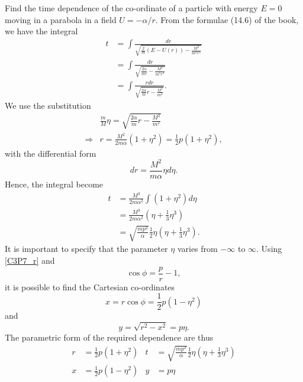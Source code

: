 \begin{problem}
{
Find the time dependence of the co-ordinate of a particle with energy $E=0$ moving in a parabola in a field $U=-\alpha/r$.
}
{
From the formulae (14.6) of the book, we have the integral
\begin{align*}
    t &= \int \frac{dr}{\sqrt{\frac{2}{m}\left(E-U(r)\right)-\frac{M^2}{m^2r^2}}} \\
    &= \int \frac{dr}{\sqrt{\frac{2\alpha}{mr}-\frac{M^2}{m^2r^2}}} \\
    &= \int \frac{rdr}{\sqrt{\frac{2\alpha}{m}r-\frac{M^2}{m^2}}}.
\end{align*}
We use the substitution
\begin{align}
    &\frac{m}{M}\eta = \sqrt{\frac{2\alpha}{m}r - \frac{M^2}{m^2}} \nonumber \\
    \Rightarrow & r = \frac{M^2}{2m\alpha}\left(1+\eta^2\right) = \frac{1}{2}p\left(1+\eta^2\right), \label{C3P7_r}
\end{align}
with the differential form
\begin{equation*}
    dr = \frac{M^2}{m\alpha}\eta d\eta.
\end{equation*}
Hence, the integral become
\begin{align*}
    t &= \frac{M^3}{2m\alpha^2}\int\left(1+\eta^2\right)d\eta \\
    &= \frac{M^3}{2m\alpha^2}\left(\eta+\frac{1}{3}\eta^3\right) \\
    &= \sqrt{\frac{mp^3}{\alpha}}\frac{1}{2}\eta\left(\eta+\frac{1}{3}\eta^3\right).
\end{align*}
It is important to specify that the parameter $\eta$ varies from $-\infty$ to $\infty$. Using \eqref{C3P7_r} and
\begin{equation*}
    \cos{\phi} = \frac{p}{r} - 1 ,
\end{equation*}
it is possible to find the Cartesian co-ordinates
\begin{equation*}
    x = r\cos{\phi} = \frac{1}{2}p\left(1-\eta^2\right)
\end{equation*}
and
\begin{equation*}
    y = \sqrt{r^2 - x^2} = p\eta .
\end{equation*}
The parametric form of the required dependence are thus
}
{
\begin{align*}
    r &= \frac{1}{2}p\left(1+\eta^2\right) & t &=  \sqrt{\frac{mp^3}{\alpha}}\frac{1}{2}\eta\left(\eta+\frac{1}{3}\eta^3\right) \\
    x &= \frac{1}{2}p\left(1-\eta^2\right) & y &= p\eta
\end{align*}
}
\end{problem}

